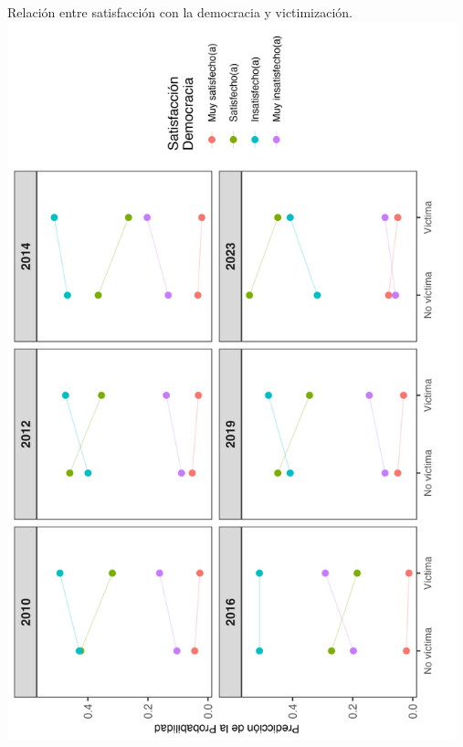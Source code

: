 \documentclass[letterpaper]{article}
\begin{document}
\begin{center}
Relación entre satisfacción con la democracia y victimización.
\includegraphics[width = 13cm]{plot_dem_03.png}
    \label{tab:plot6}
\end{center}

\newpage
\end{document}
